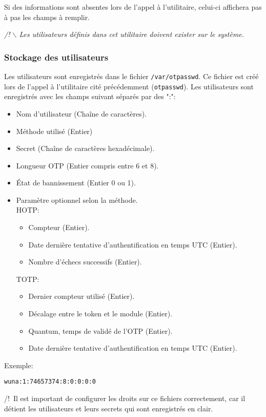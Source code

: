 \documentclass{"../../../res/univ-projet"}
\begin{document}
Si des informations sont absentes lors de l'appel à l'utilitaire, 
celui-ci affichera pas à pas les champs à remplir.

\textit{/! $\backslash$ Les utilisateurs définis dans cet utilitaire 
doivent exister sur le système.}

\subsubsection{Stockage des utilisateurs}
Les utilisateurs sont enregistrés dans le fichier \verb?/var/otpasswd?.
Ce fichier est créé lors de l'appel à l'utilitaire cité précédemment (\verb?otpasswd?).
Les utilisateurs sont enregistrés avec les champs suivant séparés par des ":":
\begin{itemize}
\item Nom d'utilisateur (Chaîne de caractères).
\item Méthode utilisé (Entier)
\item Secret (Chaîne de caractères hexadécimale).
\item Longueur OTP (Entier compris entre 6 et 8).
\item \'{E}tat de bannissement (Entier 0 ou 1).
\item Paramètre optionnel selon la méthode.\\
HOTP:
\begin{itemize}
\item Compteur (Entier).
\item Date dernière tentative d'authentification en temps UTC (Entier).
\item Nombre d'échecs successifs (Entier).
\end{itemize}
TOTP:
\begin{itemize}
\item Dernier compteur utilisé (Entier).
\item Décalage entre le token et le module (Entier).
\item Quantum, temps de validé de l'OTP (Entier).
\item Date dernière tentative d'authentification en temps UTC (Entier).
\end{itemize}
\end{itemize}

Exemple:
\begin{verbatim}
wuna:1:74657374:8:0:0:0:0
\end{verbatim}

/!\ Il est important de configurer les droits sur ce fichiers correctement, car il détient les utilisateurs et
leurs secrets qui sont enregistrés en clair.
\end{document}
